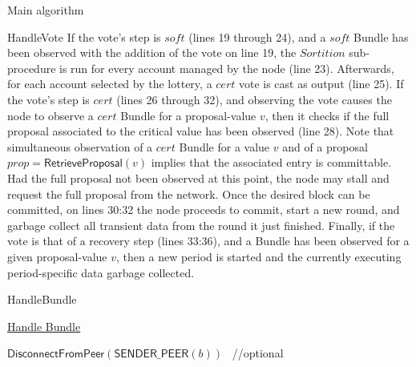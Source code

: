 \documentclass[10pt,a4paper]{article}
\begin{document}
\begin{section}{Main algorithm}
\begin{subsection}{HandleVote}
If the vote's step is $soft$ (lines 19 through 24), and a $soft$ Bundle has been observed with the addition of the vote on line 19,
the $Sortition$ sub-procedure is run for every account managed by the node (line 23). Afterwards, for each account selected by
the lottery, a $cert$ vote is cast as output (line 25).
If the vote's step is $cert$ (lines 26 through 32), and observing the vote causes the node to observe a $cert$ Bundle for a proposal-value $v$,
then it checks if the full proposal associated to the critical value has been observed (line 28). Note that simultaneous observation of a $cert$ Bundle 
for a value $v$ and of a proposal $prop = \mathsf{RetrieveProposal}(v)$ implies that the associated entry is committable.
Had the full proposal not been observed at this point, the node may stall and request the full proposal from the network.
Once the desired block can be committed, on lines 30:32 the node proceeds to commit, start a new round, and garbage collect all
transient data from the round it just finished.
Finally, if the vote is that of a recovery step (lines 33:36), and a Bundle has been observed for a given proposal-value $v$,
then a new period is started and the currently executing period-specific data garbage collected.



\end{subsection}


\begin{subsection}{HandleBundle}\label{ssect:HandleBundle}

    \begin{algorithm}[H]
        \caption{\underline{Handle Bundle}}
        \label{algo:handle-bundle}
        \begin{algorithmic}[1]



                \State $\mathsf{DisconnectFromPeer}(\mathsf{SENDER\_PEER}(b))$ \ //optional
                \Return
            \EndIf


\end{algorithmic}
\end{algorithm}
\end{subsection}
\end{section}
\end{document}
